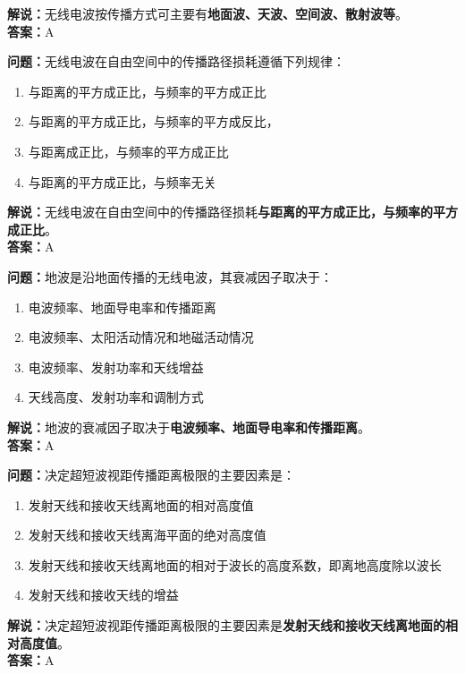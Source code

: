 \textbf{解说：}无线电波按传播方式可主要有\textbf{地面波、天波、空间波、散射波等}。\\\textbf{答案：}A%



\textbf{问题：}无线电波在自由空间中的传播路径损耗遵循下列规律：

\begin{enumerate}[label=\Alph*), leftmargin=1cm]
	\item 与距离的平方成正比，与频率的平方成正比
	\item 与距离的平方成正比，与频率的平方成反比，
	\item 与距离成正比，与频率的平方成正比
	\item 与距离的平方成正比，与频率无关
\end{enumerate}

\textbf{解说：}无线电波在自由空间中的传播路径损耗\textbf{与距离的平方成正比，与频率的平方成正比}。\\\textbf{答案：}A%



\textbf{问题：}地波是沿地面传播的无线电波，其衰减因子取决于：

\begin{enumerate}[label=\Alph*), leftmargin=1cm]
	\item 电波频率、地面导电率和传播距离
	\item 电波频率、太阳活动情况和地磁活动情况
	\item 电波频率、发射功率和天线增益
	\item 天线高度、发射功率和调制方式
\end{enumerate}

\textbf{解说：}地波的衰减因子取决于\textbf{电波频率、地面导电率和传播距离}。\\\textbf{答案：}A%



\textbf{问题：}决定超短波视距传播距离极限的主要因素是：

\begin{enumerate}[label=\Alph*), leftmargin=1cm]
	\item 发射天线和接收天线离地面的相对高度值
	\item 发射天线和接收天线离海平面的绝对高度值
	\item 发射天线和接收天线离地面的相对于波长的高度系数，即离地高度除以波长
	\item 发射天线和接收天线的增益
\end{enumerate}

\textbf{解说：}决定超短波视距传播距离极限的主要因素是\textbf{发射天线和接收天线离地面的相对高度值}。\\\textbf{答案：}A%



